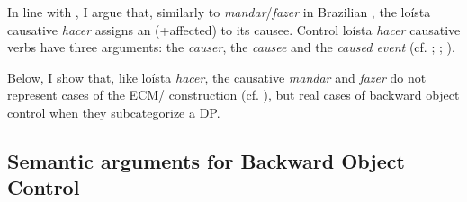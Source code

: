 \documentclass[output=paper]{langsci/langscibook}
\begin{document}
In line with \citet{López2001}, I argue that, similarly to \textit{mandar}/\textit{fazer} in Brazilian , the loísta causative \textit{hacer} assigns an (+affected)  to its causee. Control loísta \textit{hacer} causative verbs have three arguments: the \textit{causer}, the \textit{causee} and the \textit{caused event} (cf. \citealt{Zubizarreta1985}; \citealt{Alsina1992}; \citealt{Ippolito2000}). 

Below, I show that, like loísta \textit{hacer}, the causative \textit{mandar} and \textit{fazer} do not represent cases of the ECM\slash {} construction (cf. \citealt{Farrell1995}), but real cases of backward object control when they subcategorize a DP.

\subsection{Semantic arguments for Backward Object Control} %
\largerpage[2]
\end{document}
